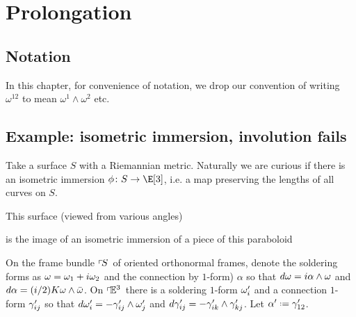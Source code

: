 \chapter{Prolongation}\label{chapter:prolongation}
%
\section{Notation}In this chapter, for convenience of notation, we drop our convention of writing \(\omega^{12}\) to mean \(\omega^1\wedge\omega^2\) etc.
\section{Example: isometric immersion, involution fails}
Take a surface \(S\) with a Riemannian metric.
Naturally we are curious if there is an isometric immersion \(\phi \colon S \to \E[3]\), i.e. a map preserving the lengths of all curves on \(S\).
\begin{example}This surface (viewed from various angles)
\begin{center}
\end{center}
is the image of an isometric immersion of a piece of this paraboloid
\begin{center}
\end{center}
\end{example}
On the frame bundle \(\left\ulcorner\!S\right.\) of oriented orthonormal frames, denote the soldering forms as \(\omega=\omega_1+i\omega_2\) and the connection by \(1\)-form) \(\alpha\) so that \(d\omega=i\alpha \wedge \omega\) and \(d\alpha=(i/2)K\omega \wedge \bar{\omega}\).
On \(\left\ulcorner\!\mathbb{E}^{3}\right.\) there is a soldering \(1\)-form \(\omega'_i\) and a connection \(1\)-form \(\gamma'_{ij}\) so that \(d\omega'_i = -\gamma'_{ij} \wedge \omega'_j\) and \(d\gamma'_{ij} = -\gamma'_{ik} \wedge \gamma'_{kj}\).
Let \(\otalpha\defeq\qc_{12}\).

